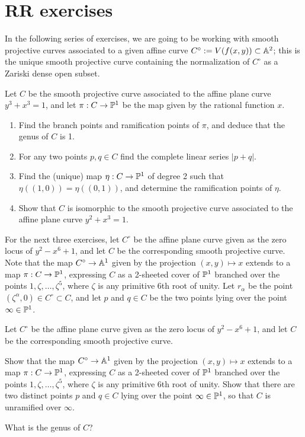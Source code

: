 
 
\chapter{RR exercises}\label{RR exercises}


In the following series of exercises, we are going to be working with smooth projective curves associated to a given affine curve $C^\circ := V(f(x,y)) \subset \AA^2$; this is the unique smooth projective curve containing the normalization of $C^\circ$ as a Zariski dense open subset.

\begin{exercise}
Let $C$ be the smooth projective curve associated to the affine plane curve $y^3+x^3 = 1$, and let $\pi : C \to \PP^1$ be the map given by the rational function $x$.
\begin{enumerate}
\item Find the branch points and ramification points of $\pi$, and deduce that the genus of $C$ is 1.
\item For any two points $p, q \in C$ find the complete linear series $|p+q|$.
\item Find the (unique) map $\eta : C \to \PP^1$ of degree 2 such that $\eta((1,0)) = \eta((0,1))$, and determine the ramification points of $\eta$.
\item Show that $C$ is isomorphic to the smooth projective curve associated to the affine plane curve $y^2 +x^3 = 1$.
\end{enumerate}
\end{exercise}

For the next three exercises, let $C^\circ$ be the affine plane curve given as the zero locus of $y^2 - x^6 +1$, and let $C$ be the corresponding smooth projective curve. Note that the map $C^\circ \to \AA^1$ given by the projection $(x,y) \mapsto x$ extends to a map $\pi : C \to \PP^1$, expressing $C$ as a 2-sheeted cover of $\PP^1$ branched over the points $1, \zeta, \dots, \zeta^5$, where $\zeta$ is any primitive 6th root of unity. Let $r_\alpha$ be the point $(\zeta^\alpha, 0) \in C^\circ \subset C$, and  let $p$ and $q \in C$ be the two points lying over the point $\infty \in \PP^1$.

\begin{exercise}\label{hyperelliptic curve 1}
Let $C^\circ$ be the affine plane curve given as the zero locus of $y^2 - x^6 +1$, and let $C$ be the corresponding smooth projective curve. 

Show  that the map $C^\circ \to \AA^1$ given by the projection $(x,y) \mapsto x$ extends to a map $\pi : C \to \PP^1$, expressing $C$ as a 2-sheeted cover of $\PP^1$ branched over the points $1, \zeta, \dots, \zeta^5$, where $\zeta$ is any primitive 6th root of unity. Show that there are two distinct points $p$ and $q \in C$  lying over the point $\infty \in \PP^1$,
so that $C$ is unramified over $\infty$.

What is the genus of $C$?
\end{exercise}

